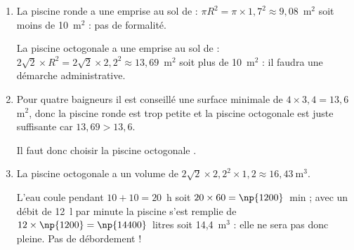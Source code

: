 \begin{enumerate}
\item %
La piscine \og ronde \fg{} a une emprise au sol de : $\pi R^2 = \pi \times 1,7^2 \approx 9,08$~m$^2$ soit moins de 10~m$^2$ : pas de formalité.

La piscine \og octogonale \fg{} a une emprise au sol de : $2\sqrt{2}\times R^2 = 2\sqrt{2} \times 2,2^2 \approx 13,69$~m$^2$ soit plus de 10~m$^2$ : il faudra une démarche administrative. 
\item %
Pour quatre baigneurs il est conseillé une surface minimale de $4 \times 3,4 = 13,6~$m$^2$, donc la piscine \og ronde est trop petite et la piscine \og octogonale \fg{} est juste suffisante car $13,69 > 13,6$.

Il faut donc choisir la piscine \og octogonale \fg.  
\item %
La piscine \og octogonale \fg a un volume de $2\sqrt{2} \times 2,2^2 \times 1,2 \approx 16,43~$m$^3$.

L'eau coule pendant $10 + 10 = 20$~h soit $20 \times 60 = \np{1200}$~min  ; avec un débit de 12~l par minute la piscine s'est remplie de $12 \times \np{1200} = \np{14400}$~litres soit 14,4~m$^3$ : elle ne sera pas donc pleine. Pas de débordement ! 
\end{enumerate} 

\bigskip

